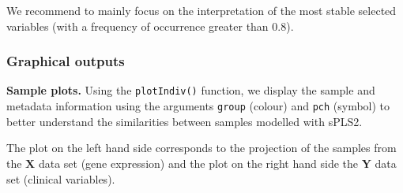 \documentclass[]{book}
\newenvironment{Shaded}{\begin{snugshade}}{\end{snugshade}}
\newcommand{\KeywordTok}[1]{\textcolor[rgb]{0.13,0.29,0.53}{\textbf{#1}}}
\newcommand{\DataTypeTok}[1]{\textcolor[rgb]{0.13,0.29,0.53}{#1}}
\newcommand{\DecValTok}[1]{\textcolor[rgb]{0.00,0.00,0.81}{#1}}
\newcommand{\StringTok}[1]{\textcolor[rgb]{0.31,0.60,0.02}{#1}}
\newcommand{\OtherTok}[1]{\textcolor[rgb]{0.56,0.35,0.01}{#1}}
\newcommand{\OperatorTok}[1]{\textcolor[rgb]{0.81,0.36,0.00}{\textbf{#1}}}
\newcommand{\NormalTok}[1]{#1}
\begin{document}
We recommend to mainly focus on the interpretation of the most stable
selected variables (with a frequency of occurrence greater than 0.8).

\subsubsection{Graphical outputs}\label{pls:result:graph}

\textbf{Sample plots.} Using the \texttt{plotIndiv()} function, we
display the sample and metadata information using the arguments
\texttt{group} (colour) and \texttt{pch} (symbol) to better understand
the similarities between samples modelled with sPLS2.

The plot on the left hand side corresponds to the projection of the
samples from the \(\boldsymbol X\) data set (gene expression) and the
plot on the right hand side the \(\boldsymbol Y\) data set (clinical
variables).

\begin{Shaded}
\end{Shaded}
\end{document}
